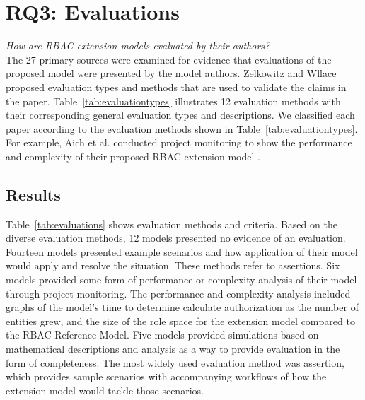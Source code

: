 
\section{RQ3: Evaluations} \label{sec:evaluations}

\textit{How are RBAC extension models evaluated by their authors?}
\\

The 27 primary sources were examined for evidence that evaluations of the proposed model were presented by the model authors. 
Zelkowitz and Wllace~\cite{Zelkowitz1998experimentalmodels} proposed evaluation types and methods that are used to validate the claims in the paper. 
Table~\ref{tab:evaluationtypes} illustrates 12 evaluation methods with their corresponding general evaluation types and descriptions. We classified each paper according to the evaluation methods shown in Table~\ref{tab:evaluationtypes}. For example, Aich et al. conducted project monitoring to show the performance and complexity of their proposed RBAC extension model \cite{aich09:role}.



\subsection{Results}

Table~\ref{tab:evaluations} shows evaluation methods and criteria.
Based on the diverse evaluation methods, 12 models presented no evidence of an evaluation. Fourteen models presented 
example scenarios and how application of their model would apply and resolve the situation. These methods refer to assertions.
Six models provided some form of performance
or complexity analysis of their model through project monitoring.  The performance and complexity analysis included graphs of the model's time to determine calculate authorization 
as the number of entities grew, and the size of the role space for the extension model compared to the RBAC Reference Model. 
Five models provided simulations based on mathematical descriptions and analysis as a way to provide evaluation in the form of completeness. 
The most widely used evaluation method was assertion, which provides sample scenarios with accompanying workflows of how the extension model
would tackle those scenarios.

